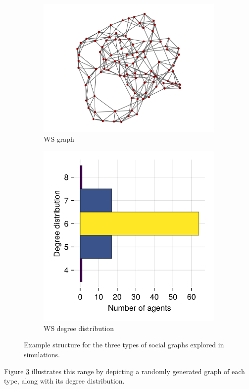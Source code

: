 \documentclass[]{article}
\begin{document}
\begin{figure}
		\begin{subfigure}{0.45\textwidth}
		\centering
		\includegraphics[width=0.9\linewidth]{../plots/g_wattsstrogatz_n100_k3_p01_s33} 
		\caption{WS graph}  \label{fig:subim31}
	\end{subfigure}
	\hfill
	\begin{subfigure}{0.45\textwidth}
		\centering
		\includegraphics[width=0.6\linewidth]{../plots/g_wattsstrogatz_hist_degree_n100_k3_p01_s33}
		\caption{WS degree distribution} \label{fig:subim32}
	\end{subfigure}
	
	\caption{Example structure for the three types of social graphs explored in simulations.}
	\label{fig:graphtypes}
\end{figure}

Figure \ref{fig:graphtypes} illustrates this range by depicting a randomly generated graph of each type, along with its degree distribution.
\end{document}
